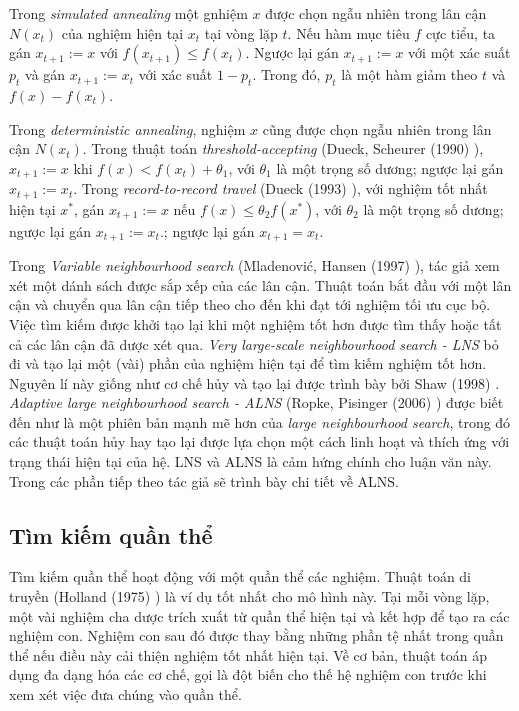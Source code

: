 Trong \textit{simulated annealing} một gnhiệm $x$ được chọn ngẫu nhiên trong lân cận $N(x_t)$ của nghiệm hiện tại $x_t$ tại vòng lặp $t$. Nếu hàm mục tiêu $f$ cực tiểu, ta gán $x_{t+1}:=x$ với $f(x_{t+1}) \leq f(x_t)$. Ngược lại gán $x_{t+1}:=x$ với một xác suất $p_t$ và gán $x_{t+1}:=x_t$ với xác suất $1-p_t$. Trong đó, $p_t$ là một hàm giảm theo $t$ và $f(x) - f(x_t)$.

Trong \textit{deterministic annealing}, nghiệm $x$ cũng được chọn ngẫu nhiên trong lân cận $N(x_t)$. Trong thuật toán \textit{threshold-accepting} (Dueck, Scheurer (1990) \cite{dueck1990threshold}), $x_{t+1}:=x$ khi $f(x) < f(x_t) + \theta_1$, với $\theta_1$ là một trọng số dương; ngược lại gán $x_{t+1}:=x_t$. Trong \textit{record-to-record travel} (Dueck (1993) \cite{dueck1993new}), với nghiệm tốt nhất hiện tại $x^*$, gán $x_{t+1}:=x$ nếu $f(x) \leq \theta_2 f(x^*)$, với $\theta_2$ là một trọng số dương; ngược lại gán $x_{t+1}:=x_t$.; ngược lại gán $x_{t+1}=x_t$.

Trong \textit{Variable neighbourhood search} (Mladenović, Hansen (1997) \cite{}), tác giả xem xét một dánh sách được sắp xếp của các lân cận. Thuật toán bắt đầu với một lân cận và chuyển qua lân cận tiếp theo cho đến khi đạt tới nghiệm tối ưu cục bộ. Việc tìm kiếm được khởi tạo lại khi một nghiệm tốt hơn được tìm thấy hoặc tất cả các lân cận đã dược xét qua. \textit{Very large-scale neighbourhood search - LNS} bỏ đi và tạo lại một (vài) phần của nghiệm hiện tại để tìm kiếm nghiệm tốt hơn. Nguyên lí này giống như cơ chế hủy và tạo lại được trình bày bởi Shaw (1998) \cite{shaw1998using}. \textit{Adaptive large neighbourhood search - ALNS} (Ropke, Pisinger (2006) \cite{ropke2006adaptive}) được biết đến như là một phiên bản mạnh mẽ hơn của \textit{large neighbourhood search}, trong đó các thuật toán hủy hay tạo lại được lựa chọn một cách linh hoạt và thích ứng với trạng thái hiện tại của hệ. LNS và ALNS là cảm hứng chính cho luận văn này. Trong các phần tiếp theo tác giả sẽ trình bày chi tiết về ALNS.

\subsection{Tìm kiếm quần thể}

Tìm kiếm quần thể hoạt động với một quần thể các nghiệm. Thuật toán di truyền (Holland (1975) \cite{holland1975adaptation}) là ví dụ tốt nhất cho mô hình này. Tại mỗi vòng lặp, một vài nghiệm cha dược trích xuất từ quần thể hiện tại và kết hợp để tạo ra các nghiệm con. Nghiệm con sau đó được thay bằng những phần tệ nhất trong quần thể nếu điều này cải thiện nghiệm tốt nhất hiện tại. Về cơ bản, thuật toán áp dụng đa dạng hóa các cơ chế, gọi là đột biến cho thế hệ nghiệm con trước khi xem xét việc đưa chúng vào quần thể.


